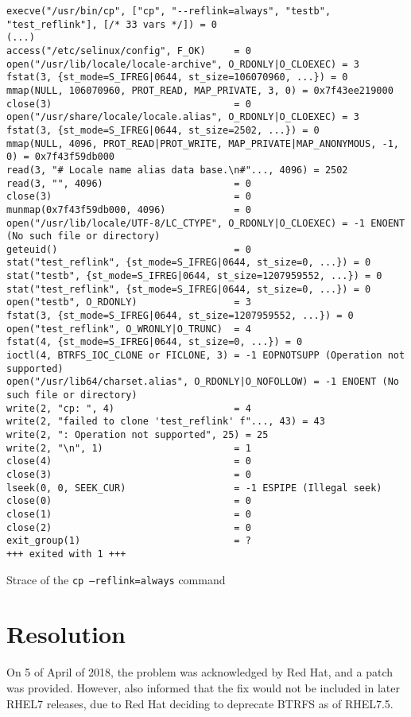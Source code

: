 \begin{listing}[h!]
\begin{verbatim}
execve("/usr/bin/cp", ["cp", "--reflink=always", "testb", "test_reflink"], [/* 33 vars */]) = 0
(...)
access("/etc/selinux/config", F_OK)     = 0
open("/usr/lib/locale/locale-archive", O_RDONLY|O_CLOEXEC) = 3
fstat(3, {st_mode=S_IFREG|0644, st_size=106070960, ...}) = 0
mmap(NULL, 106070960, PROT_READ, MAP_PRIVATE, 3, 0) = 0x7f43ee219000
close(3)                                = 0
open("/usr/share/locale/locale.alias", O_RDONLY|O_CLOEXEC) = 3
fstat(3, {st_mode=S_IFREG|0644, st_size=2502, ...}) = 0
mmap(NULL, 4096, PROT_READ|PROT_WRITE, MAP_PRIVATE|MAP_ANONYMOUS, -1, 0) = 0x7f43f59db000
read(3, "# Locale name alias data base.\n#"..., 4096) = 2502
read(3, "", 4096)                       = 0
close(3)                                = 0
munmap(0x7f43f59db000, 4096)            = 0
open("/usr/lib/locale/UTF-8/LC_CTYPE", O_RDONLY|O_CLOEXEC) = -1 ENOENT (No such file or directory)
geteuid()                               = 0
stat("test_reflink", {st_mode=S_IFREG|0644, st_size=0, ...}) = 0
stat("testb", {st_mode=S_IFREG|0644, st_size=1207959552, ...}) = 0
stat("test_reflink", {st_mode=S_IFREG|0644, st_size=0, ...}) = 0
open("testb", O_RDONLY)                 = 3
fstat(3, {st_mode=S_IFREG|0644, st_size=1207959552, ...}) = 0
open("test_reflink", O_WRONLY|O_TRUNC)  = 4
fstat(4, {st_mode=S_IFREG|0644, st_size=0, ...}) = 0
ioctl(4, BTRFS_IOC_CLONE or FICLONE, 3) = -1 EOPNOTSUPP (Operation not supported)
open("/usr/lib64/charset.alias", O_RDONLY|O_NOFOLLOW) = -1 ENOENT (No such file or directory)
write(2, "cp: ", 4)                     = 4
write(2, "failed to clone 'test_reflink' f"..., 43) = 43
write(2, ": Operation not supported", 25) = 25
write(2, "\n", 1)                       = 1
close(4)                                = 0
close(3)                                = 0
lseek(0, 0, SEEK_CUR)                   = -1 ESPIPE (Illegal seek)
close(0)                                = 0
close(1)                                = 0
close(2)                                = 0
exit_group(1)                           = ?
+++ exited with 1 +++
\end{verbatim}
\caption{Strace of the \texttt{cp --reflink=always} command}
\label{listing:icbd_nameserver}
\end{listing}


\section{Resolution}
\label{sec:resolution}
On 5 of April of 2018, the problem was acknowledged by Red Hat, and a patch was provided. However, also informed that the fix would not be included in later RHEL7 releases, due to Red Hat deciding to deprecate BTRFS as of RHEL7.5.

